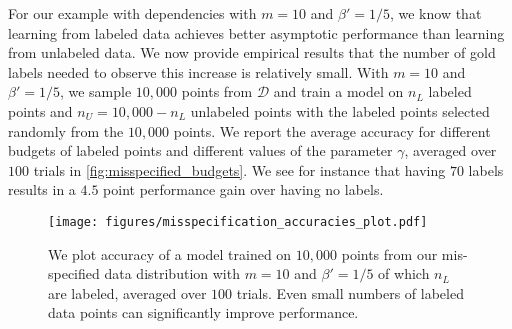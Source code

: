 For our example with dependencies with $m=10$ and $\beta'=1/5$, we know that learning from labeled data achieves better asymptotic performance than learning from unlabeled data. We now provide empirical results that the number of gold labels needed to observe this increase is relatively small. With $m=10$ and $\beta'=1/5$, we sample $10,000$ points from $\mathcal{D}$ and train a model on $n_L$ labeled points and $n_U=10,000-n_L$ unlabeled points with the labeled points selected randomly from the $10,000$ points. We report the average accuracy for different budgets of labeled points and different values of the parameter $\gamma$, averaged over $100$ trials in \autoref{fig:misspecified_budgets}. We see for instance that having $70$ labels results in a $4.5$ point performance gain over having no labels.

\begin{figure}
    \centering
    \texttt{[image: figures/misspecification\_accuracies\_plot.pdf]}
    \caption{We plot accuracy of a model trained on $10,000$ points from our mis-specified data distribution with $m=10$ and $\beta'=1/5$ of which $n_L$ are labeled, averaged over $100$ trials. Even small numbers of labeled data points can significantly improve performance.}
    \label{fig:misspecified_budgets}
\end{figure}